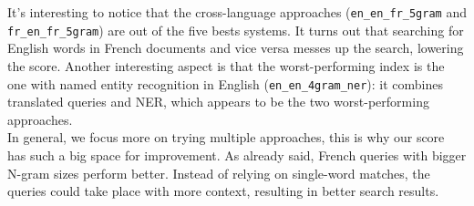 It's interesting to notice that the cross-language approaches (\texttt{en\_en\_fr\_5gram} and
\texttt{fr\_en\_fr\_5gram}) are out of the five bests systems.
It turns out that searching for English words in French documents and vice versa messes up the search, lowering the
score.
Another interesting aspect is that the worst-performing index is the one with named entity recognition in English
(\texttt{en\_en\_4gram\_ner}): it combines translated queries and NER, which appears to be the two worst-performing
approaches.\\

In general, we focus more on trying multiple approaches, this is why our score has such a big space for improvement.
As already said, French queries with bigger N-gram sizes perform better.
Instead of relying on single-word matches, the queries could take place with more context, resulting in better search
results.\\

\newpage